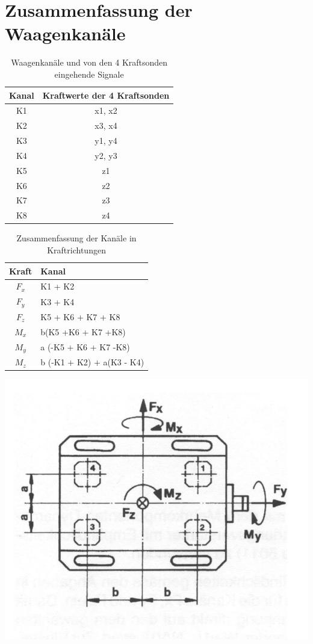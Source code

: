 \section*{Zusammenfassung der Waagenkanäle}
\begin{table}[h!]
	\centering
	\caption{Waagenkanäle und von den 4 Kraftsonden eingehende Signale}
	\label{tab:Kanäle}
	\begin{tabular}{c c}
		\toprule
		Kanal & Kraftwerte der 4 Kraftsonden \\
		\midrule
		K1	& x1, x2\\
		K2	& x3, x4\\
		K3	& y1, y4\\
		K4 	& y2, y3\\
		K5	& z1\\
		K6	& z2\\
		K7	& z3\\
		K8	& z4\\
		\bottomrule
	\end{tabular}
\end{table}

\begin{table}[h!]
\centering
\caption{Zusammenfassung der Kanäle in Kraftrichtungen}
\label{tab:Kräfte}
\begin{tabular}{c l}
	\toprule
	Kraft & Kanal \\
	\midrule
	$F_x$	& K1 + K2\\
	$F_y$	& K3 + K4\\
	$F_z$	& K5 + K6 + K7 + K8\\
	$M_x$	& b(K5 +K6 + K7 +K8)\\
	$M_y$	& a (-K5 + K6 + K7 -K8)\\
	$M_z$	& b (-K1 + K2) + a(K3 - K4)\\
	\bottomrule
\end{tabular}
\end{table}

\begin{minipage}{.5\textwidth}
	\includegraphics[width=\linewidth]{bilder/anhang/kraftmess}
	\label{fig:kraftmess}
\end{minipage}